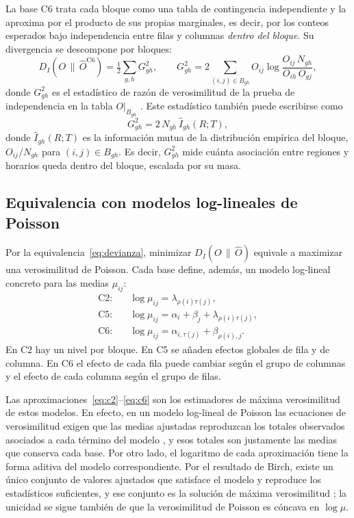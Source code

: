 La base C6 trata cada bloque como una tabla de contingencia independiente y la
aproxima por el producto de sus propias marginales, es decir, por los conteos
esperados bajo independencia entre filas y columnas \emph{dentro del bloque}. Su
divergencia se descompone por bloques:
\begin{equation}\label{eq:c6-g2}
  D_I\!\left(O \,\|\, \hat{O}^{\mathrm{C6}}\right)
  = \tfrac{1}{2} \sum_{g,h} G^2_{gh}, \qquad
  G^2_{gh} = 2 \sum_{(i,j) \in B_{gh}} O_{ij} \log \frac{O_{ij}\, N_{gh}}{O_{ih}\, O_{gj}},
\end{equation}
donde $G^2_{gh}$ es el estadístico de razón de verosimilitud de la prueba de
independencia en la tabla $O|_{B_{gh}}$ \cite[Sec.~3.2.1, ec.~3.11]{Agresti2013}.
Este estadístico también puede escribirse como
\begin{equation}\label{eq:g2-im}
  G^2_{gh} = 2\, N_{gh}\, \hat{I}_{gh}(R;T),
\end{equation}
donde $\hat{I}_{gh}(R;T)$ es la información mutua de la distribución empírica del
bloque, $O_{ij}/N_{gh}$ para $(i,j) \in B_{gh}$. Es decir, $G^2_{gh}$ mide cuánta
asociación entre regiones y horarios queda dentro del bloque, escalada por su masa.

\subsection{Equivalencia con modelos log-lineales de Poisson}\label{sec:loglineal}

Por la equivalencia~\eqref{eq:devianza}, minimizar $D_I(O \,\|\, \hat{O})$ equivale a
maximizar una verosimilitud de Poisson. Cada base define, además, un modelo
log-lineal concreto para las medias $\mu_{ij}$:
\begin{align}
  \text{C2:}\quad & \log \mu_{ij} = \lambda_{\rho(i)\tau(j)}, \label{eq:ll-c2}\\
  \text{C5:}\quad & \log \mu_{ij} = \alpha_i + \beta_j + \lambda_{\rho(i)\tau(j)}, \label{eq:ll-c5}\\
  \text{C6:}\quad & \log \mu_{ij} = \alpha_{i,\tau(j)} + \beta_{\rho(i),j}. \label{eq:ll-c6}
\end{align}
En C2 hay un nivel por bloque. En C5 se añaden efectos globales de fila y de
columna. En C6 el efecto de cada fila puede cambiar según el grupo de columnas y
el efecto de cada columna según el grupo de filas.

Las aproximaciones~\eqref{eq:c2}--\eqref{eq:c6} son los estimadores de máxima
verosimilitud de estos modelos. En efecto, en un modelo log-lineal de Poisson las
ecuaciones de verosimilitud exigen que las medias ajustadas reproduzcan los
totales observados asociados a cada término del modelo
\cite[Secs.~4.4.9 y~9.6.2]{Agresti2013}, y esos totales son justamente las medias
que conserva cada base. Por otro lado, el logaritmo de cada aproximación tiene la
forma aditiva del modelo correspondiente. Por el resultado de Birch, existe un
único conjunto de valores ajustados que satisface el modelo y reproduce los
estadísticos suficientes, y ese conjunto es la solución de máxima verosimilitud
\cite[Sec.~9.6.3]{Agresti2013}; la unicidad se sigue también de que la
verosimilitud de Poisson es cóncava en $\log \mu$.

